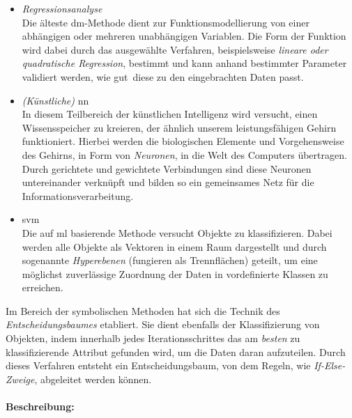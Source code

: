 \begin{itemize}
\item \textit{Regressionsanalyse}
\\ Die älteste \gls{dm}-Methode dient zur Funktionsmodellierung von einer abhängigen oder mehreren unabhängigen Variablen. Die Form der Funktion wird dabei durch das ausgewählte Verfahren, beispielsweise \textit{lineare oder quadratische Regression}, bestimmt und kann anhand bestimmter Parameter validiert werden, wie \glqq gut\grqq~diese zu den eingebrachten Daten passt.

\item \textit{(Künstliche)} \gls{nn}
\\ In diesem Teilbereich der künstlichen Intelligenz wird versucht, einen Wissensspeicher zu kreieren, der ähnlich unserem leistungsfähigen Gehirn funktioniert. Hierbei werden die biologischen Elemente und Vorgehensweise des Gehirns, in Form von \textit{Neuronen}, in die Welt des Computers übertragen. Durch gerichtete und gewichtete Verbindungen sind diese Neuronen untereinander verknüpft und bilden so ein gemeinsames Netz für die Informationsverarbeitung.

\item \gls{svm}
\\ Die auf \gls{ml} basierende Methode versucht Objekte zu klassifizieren. Dabei werden alle Objekte als Vektoren in einem Raum dargestellt und durch sogenannte \textit{Hyperebenen} (fungieren als Trennflächen) geteilt, um eine möglichst zuverlässige Zuordnung der Daten in vordefinierte Klassen zu erreichen.
\end{itemize}

Im Bereich der symbolischen Methoden hat sich die Technik des \textit{Entscheidungsbaumes} etabliert. Sie dient ebenfalls der Klassifizierung von Objekten, indem innerhalb jedes Iterationsschrittes das am \textit{besten} zu klassifizierende Attribut gefunden wird, um die Daten daran aufzuteilen. Durch dieses Verfahren entsteht ein Entscheidungsbaum, von dem Regeln, wie \textit{If-Else-Zweige}, abgeleitet werden können.

\paragraph{Beschreibung:}

